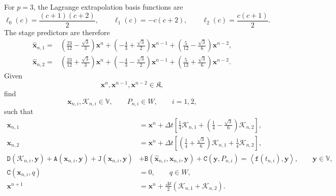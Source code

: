 \documentclass[11pt,a4paper]{article}
\newcommand{\bs}{\boldsymbol}
\newcommand{\dt}{\Delta t}
\newcommand{\V}{\mathbb V}
\newcommand{\DD}{\mathtt D}
\newcommand{\Aform}{\mathtt A}
\newcommand{\JJ}{\mathtt J}
\newcommand{\BB}{\mathtt B}
\newcommand{\CC}{\mathtt C}
\newcommand{\ff}{\mathtt f}
\newcommand{\dual}[2]{\left\langle#1,#2\right\rangle}
\theoremstyle{definition}
\numberwithin{equation}{section}
\begin{document}
For \(p=3\), the Lagrange extrapolation basis functions are
\begin{equation}\label{eq:ho:order-three-basis}
 \ell_0(c)=\frac{(c+1)(c+2)}2,
 \qquad
 \ell_1(c)=-c(c+2),
 \qquad
 \ell_2(c)=\frac{c(c+1)}2.
\end{equation}
The stage predictors are therefore
\begin{equation}\label{eq:ho:order-three-explicit-predictor}
\begin{aligned}
 \widehat{\bs x}_{n,1}
 ={}&
 \left(\frac{23}{12}-\frac{\sqrt3}{3}\right)\bs x^n
 +
 \left(-\frac43+\frac{\sqrt3}{2}\right)\bs x^{n-1}
 +
 \left(\frac5{12}-\frac{\sqrt3}{6}\right)\bs x^{n-2},
 \\
 \widehat{\bs x}_{n,2}
 ={}&
 \left(\frac{23}{12}+\frac{\sqrt3}{3}\right)\bs x^n
 +
 \left(-\frac43-\frac{\sqrt3}{2}\right)\bs x^{n-1}
 +
 \left(\frac5{12}+\frac{\sqrt3}{6}\right)\bs x^{n-2}.
\end{aligned}
\end{equation}
%
Given
\[
 \bs x^n,\bs x^{n-1},\bs x^{n-2}\in\mathfrak K,
\]
find
\[
 \bs x_{n,i},\mathcal K_{n,i}\in\V,
 \qquad
 P_{n,i}\in W,
 \qquad i=1,2,
\]
such that
\begin{subequations}\label{eq:ho:order-three-scheme}
\begin{align}
 \bs x_{n,1}
 &=
 \bs x^n
 +
 \dt\left[
 \frac14\mathcal K_{n,1}
 +
 \left(
 \frac14-\frac{\sqrt3}{6}
 \right)\mathcal K_{n,2}
 \right],
 \label{eq:ho:order-three-stage-one}
 \\
 \bs x_{n,2}
 &=
 \bs x^n
 +
 \dt\left[
 \left(
 \frac14+\frac{\sqrt3}{6}
 \right)\mathcal K_{n,1}
 +
 \frac14\mathcal K_{n,2}
 \right],
 \label{eq:ho:order-three-stage-two}
 \\
 \DD(\mathcal K_{n,i},\bs y)
 +\Aform(\bs x_{n,i},\bs y)
 +\JJ(\bs x_{n,i},\bs y)
 &+
 \BB(\widehat{\bs x}_{n,i},\bs x_{n,i},\bs y)
 +\CC(\bs y,P_{n,i})
 =
 \dual{\ff(t_{n,i})}{\bs y},
 \qquad
 \bs y\in\V,
 \label{eq:ho:order-three-stage-equation}
 \\
 \CC(\bs x_{n,i},q)
 &=0,
 \qquad
 q\in W,
 \label{eq:ho:order-three-constraint}
 \\
 \bs x^{n+1}
 &=
 \bs x^n
 +
 \frac{\dt}{2}
 \left(
 \mathcal K_{n,1}+\mathcal K_{n,2}
 \right).
 \label{eq:ho:order-three-update}
\end{align}
\end{subequations}
\end{document}
